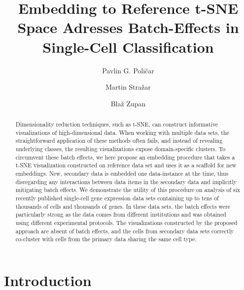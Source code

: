 \documentclass[runningheads]{llncs}
\begin{document}
%
\title{Embedding to Reference t-SNE Space Adresses Batch-Effects in Single-Cell Classification}
%
%
\author{Pavlin G. Poli\v{c}ar \and
Martin Stra\v{z}ar \and
Bla\v{z} Zupan}
%
%

\maketitle

\begin{abstract}

Dimensionality reduction techniques, such as t-SNE, can construct informative
visualizations of high-dimensional data. When working with multiple data sets,
the straightforward application of these methods often fails, and instead of
revealing underlying classes, the resulting visualizations expose
domain-specific clusters. To circumvent these batch effects, we here propose an
embedding procedure that takes a t-SNE visualization constructed on reference
data set and uses it as a scaffold for new embeddings. New, secondary data is
embedded one data-instance at the time, thus disregarding any interactions
between data items in the secondary data and implicitly mitigating batch
effects. We demonstrate the utility of this procedure on analysis of six
recently published single-cell gene expression data sets containing up to tens
of thousands of cells and thousands of genes. In these data sets, the batch
effects were particularly strong as the data comes from different institutions
and was obtained using different experimental protocols. The visualizations
constructed by the proposed approach are absent of batch effects, and the cells
from secondary data sets correctly co-cluster with cells from the primary data
sharing the same cell type.

\end{abstract}


\section{Introduction}
\end{document}
